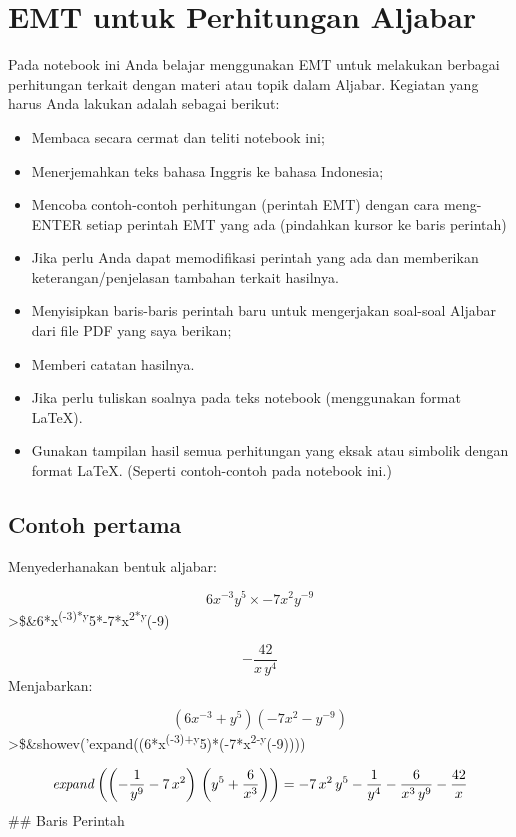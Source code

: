 \documentclass[
]{book}
\author{}
\date{}
\providecommand{\tightlist}{%
  \setlength{\itemsep}{0pt}\setlength{\parskip}{0pt}}
\begin{document}
\frontmatter

\mainmatter
\chapter{EMT untuk Perhitungan Aljabar}\label{emt-untuk-perhitungan-aljabar}

Pada notebook ini Anda belajar menggunakan EMT untuk melakukan berbagai perhitungan terkait dengan materi atau topik dalam Aljabar. Kegiatan yang harus Anda lakukan adalah sebagai berikut:

\begin{itemize}
\tightlist
\item
  Membaca secara cermat dan teliti notebook ini;
\item
  Menerjemahkan teks bahasa Inggris ke bahasa Indonesia;
\item
  Mencoba contoh-contoh perhitungan (perintah EMT) dengan cara meng-ENTER setiap perintah EMT yang ada (pindahkan kursor ke baris perintah)
\item
  Jika perlu Anda dapat memodifikasi perintah yang ada dan memberikan keterangan/penjelasan tambahan terkait hasilnya.
\item
  Menyisipkan baris-baris perintah baru untuk mengerjakan soal-soal Aljabar dari file PDF yang saya berikan;
\item
  Memberi catatan hasilnya.
\item
  Jika perlu tuliskan soalnya pada teks notebook (menggunakan format LaTeX).
\item
  Gunakan tampilan hasil semua perhitungan yang eksak atau simbolik dengan format LaTeX. (Seperti contoh-contoh pada notebook ini.)
\end{itemize}

\section{Contoh pertama}\label{contoh-pertama}

Menyederhanakan bentuk aljabar:

\[6x^{-3}y^5\times -7x^2y^{-9}\]\textgreater\$\&6*x\textsuperscript{(-3)*y}5*-7*x\textsuperscript{2*y}(-9)

\[-\frac{42}{x\,y^4}\]Menjabarkan:

\[(6x^{-3}+y^5)(-7x^2-y^{-9})\]\textgreater\$\&showev('expand((6*x\textsuperscript{(-3)+y}5)*(-7*x\textsuperscript{2-y}(-9))))

\[{\it expand}\left(\left(-\frac{1}{y^9}-7\,x^2\right)\,\left(y^5+
 \frac{6}{x^3}\right)\right)=-7\,x^2\,y^5-\frac{1}{y^4}-\frac{6}{x^3
 \,y^9}-\frac{42}{x}\]\#\# Baris Perintah
\end{document}
